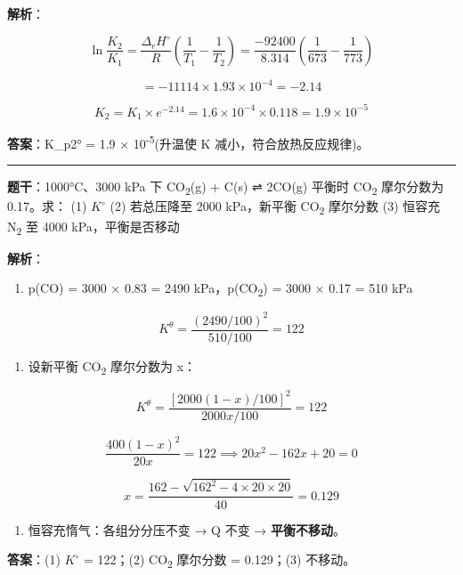 \documentclass[a4paper,11pt]{ctexart}
\providecommand{\tightlist}{\setlength{\itemsep}{0pt}\setlength{\parskip}{0pt}}
\begin{document}
\textbf{解析}：

\[\ln\frac{K_2}{K_1} = \frac{\Delta_rH^\circ}{R}\left(\frac{1}{T_1} - \frac{1}{T_2}\right) = \frac{-92400}{8.314}\left(\frac{1}{673} - \frac{1}{773}\right)\]

\[= -11114 \times 1.93 \times 10^{-4} = -2.14\]

\[K_2 = K_1 \times e^{-2.14} = 1.6 \times 10^{-4} \times 0.118 = 1.9 \times 10^{-5}\]

\textbf{答案}：K\_p2° = 1.9 × 10\textsuperscript{-5}(升温使 K 减小，符合放热反应规律)。

\begin{center}\rule{0.5\linewidth}{0.5pt}\end{center}

\textbf{题干}：1000°C、3000 kPa 下 CO\textsubscript{2}(g) + C(s) ⇌ 2CO(g) 平衡时 CO\textsubscript{2} 摩尔分数为 0.17。求：
(1) \(K^{\circ}\)
(2) 若总压降至 2000 kPa，新平衡 CO\textsubscript{2} 摩尔分数
(3) 恒容充 N\textsubscript{2} 至 4000 kPa，平衡是否移动

\textbf{解析}：

\begin{enumerate}
\def\labelenumi{(\arabic{enumi})}
\tightlist
\item
  p(CO) = 3000 × 0.83 = 2490 kPa，p(CO\textsubscript{2}) = 3000 × 0.17 = 510 kPa
\end{enumerate}

\[K^\theta = \frac{(2490/100)^2}{510/100} = 122\]

\begin{enumerate}
\def\labelenumi{(\arabic{enumi})}
\setcounter{enumi}{1}
\tightlist
\item
  设新平衡 CO\textsubscript{2} 摩尔分数为 x：
\end{enumerate}

\[K^\theta = \frac{[2000(1-x)/100]^2}{2000x/100} = 122\]

\[\frac{400(1-x)^2}{20x} = 122 \implies 20x^2 - 162x + 20 = 0\]

\[x = \frac{162 - \sqrt{162^2 - 4 \times 20 \times 20}}{40} = 0.129\]

\begin{enumerate}
\def\labelenumi{(\arabic{enumi})}
\setcounter{enumi}{2}
\tightlist
\item
  恒容充惰气：各组分分压不变 → Q 不变 → \textbf{平衡不移动}。
\end{enumerate}

\textbf{答案}：(1) \(K^{\circ}\) = 122；(2) CO\textsubscript{2} 摩尔分数 = 0.129；(3) 不移动。
\end{document}
